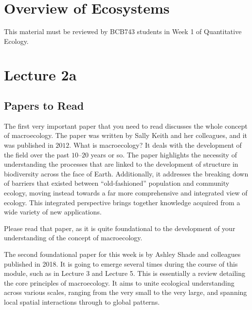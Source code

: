 \documentclass[
  10pt,
]{book}
\begin{document}
\chapter{Overview of Ecosystems}\label{overview-of-ecosystems}

\begin{tcolorbox}[enhanced jigsaw, leftrule=.75mm, arc=.35mm, title=\textcolor{quarto-callout-note-color}{\faInfo}\hspace{0.5em}{BCB743}, opacityback=0, colframe=quarto-callout-note-color-frame, toprule=.15mm, bottomtitle=1mm, opacitybacktitle=0.6, titlerule=0mm, colback=white, left=2mm, colbacktitle=quarto-callout-note-color!10!white, toptitle=1mm, rightrule=.15mm, breakable, coltitle=black, bottomrule=.15mm]

This material must be reviewed by BCB743 students in Week 1 of
Quantitative Ecology.

\end{tcolorbox}

\chapter*{Lecture 2a}\label{lecture-2a}

\section{Papers to Read}\label{papers-to-read}

The first very important paper that you need to read discusses the whole
concept of macroecology. The paper was written by Sally Keith and her
colleagues, and it was published in \(2012\). What is macroecology? It
deals with the development of the field over the past \(10\text{--}20\)
years or so. The paper highlights the necessity of understanding the
processes that are linked to the development of structure in
biodiversity across the face of Earth. Additionally, it addresses the
breaking down of barriers that existed between ``old-fashioned''
population and community ecology, moving instead towards a far more
comprehensive and integrated view of ecology. This integrated
perspective brings together knowledge acquired from a wide variety of
new applications.

Please read that paper, as it is quite foundational to the development
of your understanding of the concept of macroecology.

The second foundational paper for this week is by Ashley Shade and
colleagues published in 2018. It is going to emerge several times during
the course of this module, such as in Lecture 3 and Lecture 5. This is
essentially a review detailing the core principles of macroecology. It
aims to unite ecological understanding across various scales, ranging
from the very small to the very large, and spanning local spatial
interactions through to global patterns.
\end{document}
